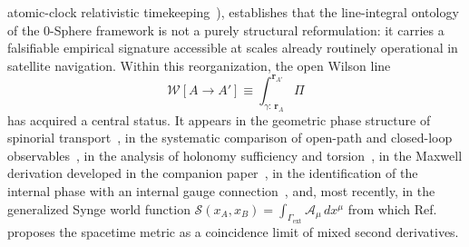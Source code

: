 \documentclass[%
 reprint, amsmath,amssymb, aps, prb, ]{revtex4-2}
\numberwithin{equation}{section}
\newcommand{\WL}{\mathcal{W}}
\begin{document}
atomic-clock relativistic timekeeping~\cite{ashby2003}), establishes that the line-integral ontology of the 0-Sphere framework is not a purely structural reformulation: it carries a falsifiable empirical signature accessible at scales already routinely operational in satellite navigation. Within this reorganization, the open Wilson line
\begin{equation}
\WL[A \to A'] \equiv \int_{\gamma:\,\mathbf{r}_A}^{\mathbf{r}_{A'}} \Pi
\label{eq:WL_intro}
\end{equation}
has acquired a central status. It appears in the geometric phase structure of spinorial transport~\cite{hanamura29}, in the systematic comparison of open-path and closed-loop observables~\cite{hanamura43}, in the analysis of holonomy sufficiency and torsion~\cite{hanamura45}, in the Maxwell derivation developed in the companion paper~\cite{hanamura54}, in the identification of the internal phase with an internal gauge connection~\cite{hanamura17, hanamura45}, and, most recently, in the generalized Synge world function $\mathcal{S}(x_A,x_B) = \int_{\Gamma_{\text{ext}}}\mathcal{A}_\mu\,dx^\mu$ from which Ref.~\cite{hanamura51} proposes the spacetime metric as a coincidence limit of mixed second derivatives.
\end{document}
